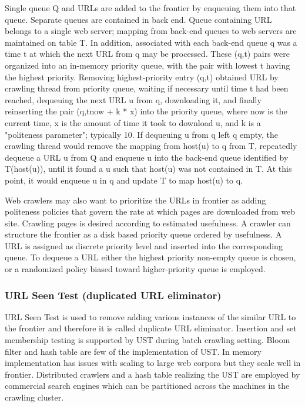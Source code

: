 \documentclass[article,type=msc,colorback,accentcolor=tud9c,twoside,11pt]{tudthesis}
\begin{document}
Single queue Q and URLs are added to the frontier by enqueuing them into that queue. Separate queues are contained in back end. Queue containing URL belongs to a single web server; mapping from back-end queues to web servers are maintained on table T. In addition, associated with each back-end queue q was a time t at which the next URL from q may be processed. These (q,t) pairs were organized into an in-memory priority queue, with the pair with lowest t having the highest priority.  Removing highest-priority entry (q,t) obtained URL by crawling thread from priority queue, waiting if necessary until time t had been reached, dequeuing the next URL u from q, downloading it, and finally reinserting the pair (q,tnow + k * x) into the priority queue, where now is the current time, x is the amount of time it took to download u, and k is a "politeness parameter"; typically 10. If dequeuing u from q left q empty, the crawling thread would remove the mapping from host(u) to q from T, repeatedly dequeue a URL u from Q and enqueue u into the back-end queue identified by T(host(u)), until it found a u such that host(u) was not contained in T. At this point, it would enqueue u in q and update T to map host(u) to q.

Web crawlers may also want to prioritize the URLs in  frontier as adding politeness policies that govern the rate at which pages are downloaded from web site. Crawling pages is desired according to estimated usefulness. A crawler can structure the frontier as a disk based priority queue ordered by usefulness. A URL is assigned as discrete priority level and inserted into the corresponding queue. To dequeue a URL either the highest priority non-empty queue is chosen, or a randomized policy biased toward higher-priority queue is employed.

\subsubsection{URL Seen Test (duplicated URL eliminator)}
URL Seen Test is used to remove adding various instances of the similar URL to the frontier and therefore it is called duplicate URL eliminator. Insertion and set membership testing is supported by UST during batch crawling setting. Bloom filter and hash table are few of the implementation of UST. In memory implementation has issues with scaling to large web corpora but they scale well in frontier. Distributed crawlers and a hash table realizing the UST are employed by commercial search engines which can be partitioned across the machines in the crawling cluster.
\end{document}
